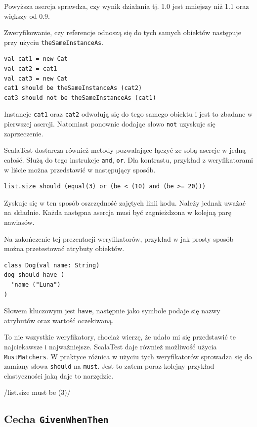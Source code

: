 \documentclass[brudnopis]{xmgr}
\begin{document}
Powyższa asercja sprawdza, czy wynik działania tj. 1.0 jest mniejszy niż 1.1 oraz większy od 0.9.

Zweryfikowanie, czy referencje odnoszą się do tych samych obiektów następuje przy użyciu \texttt{theSameInstanceAs}.

\begin{verbatim}
val cat1 = new Cat
val cat2 = cat1
val cat3 = new Cat	
cat1 should be theSameInstanceAs (cat2)
cat3 should not be theSameInstanceAs (cat1)
\end{verbatim}

Instancje \texttt{cat1} oraz \texttt{cat2} odwołują się do tego samego obiektu i jest to zbadane w pierwszej asercji. Natomiast ponownie dodając słowo \texttt{not} uzyskuje się zaprzeczenie.

ScalaTest dostarcza również metody pozwalające łączyć ze sobą asercje w jedną całość. Służą do tego instrukcje \texttt{and}, \texttt{or}. Dla kontrastu, przykład z weryfikatorami w liście można przedstawić w następujący sposób.

\begin{verbatim}
list.size should (equal(3) or (be < (10) and (be >= 20)))
\end{verbatim}

Zyskuje się w ten sposób oszczędność zajętych linii kodu. Należy jednak uważać na składnie. Każda następna asercja musi być zagnieżdzona w kolejną parę nawiasów.

Na zakończenie tej prezentacji weryfikatorów, przykład w jak prosty sposób można przetestować atrybuty obiektów.

\begin{verbatim}
class Dog(val name: String)
dog should have (
  'name ("Luna")
)
\end{verbatim}

Słowem kluczowym jest \texttt{have}, następnie jako symbole podaje się nazwy atrybutów oraz wartość oczekiwaną.

To nie wszystkie weryfikatory, chociaż wierzę, że udało mi się przedstawić te najciekawsze i najważniejsze. ScalaTest daje również możliwość użycia \texttt{MustMatchers}. W praktyce różnica w użyciu tych weryfikatorów sprowadza się do zamiany słowa \texttt{should} na \texttt{must}. Jest to zatem poraz kolejny przykład elastyczności jaką daje to narzędzie.

/list.size must be (3)/ 

\subsection{Cecha \texttt{GivenWhenThen}}
\end{document}
